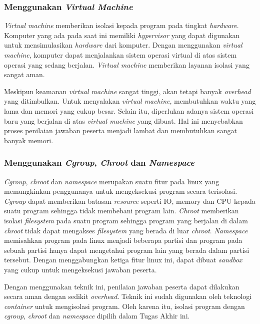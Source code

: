 \subsubsection{Menggunakan \textit{Virtual Machine}}

\par \textit{Virtual machine} memberikan isolasi kepada program pada tingkat \textit{hardware}. Komputer yang ada pada saat ini memiliki \textit{hypervisor} yang dapat digunakan untuk mensimulasikan \textit{hardware} dari komputer. Dengan menggunakan \textit{virtual machine}, komputer dapat menjalankan sistem operasi virtual di atas sistem operasi yang sedang berjalan. \textit{Virtual machine} memberikan layanan isolasi yang sangat aman.

\par Meskipun keamanan \textit{virtual machine} sangat tinggi, akan tetapi banyak \textit{overhead} yang ditimbulkan. Untuk menyalakan \textit{virtual machine}, membutuhkan waktu yang lama dan memori yang cukup besar. Selain itu, diperlukan adanya sistem operasi baru yang berjalan di atas \textit{virtual machine} yang dibuat. Hal ini menyebabkan proses penilaian jawaban peserta menjadi lambat dan membutuhkan sangat banyak memori.

\subsubsection{Menggunakan \textit{Cgroup}, \textit{Chroot} dan \textit{Namespace}}

\par \textit{Cgroup}, \textit{chroot} dan \textit{namespace} merupakan suatu fitur pada linux yang memungkinkan penggunanya untuk mengeksekusi program secara terisolasi. \textit{Cgroup} dapat memberikan batasan \textit{resource} seperti IO, memory dan CPU kepada suatu program sehingga tidak membebani program lain. \textit{Chroot} memberikan isolasi \textit{filesystem} pada suatu program sehingga program yang berjalan di dalam \textit{chroot} tidak dapat mengakses \textit{filesystem} yang berada di luar \textit{chroot}. \textit{Namespace} memisahkan program pada linux menjadi beberapa partisi dan program pada sebuah partisi hanya dapat mengetahui program lain yang berada dalam partisi tersebut. Dengan menggabungkan ketiga fitur linux ini, dapat dibuat \textit{sandbox} yang cukup untuk mengeksekusi jawaban peserta.

\par Dengan menggunakan teknik ini, penilaian jawaban peserta dapat dilakukan secara aman dengan sedikit \textit{overhead}. Teknik ini sudah digunakan oleh teknologi \textit{container} untuk mengisolasi program. Oleh karena itu, isolasi program dengan \textit{cgroup}, \textit{chroot} dan \textit{namespace} dipilih dalam Tugas Akhir ini.

